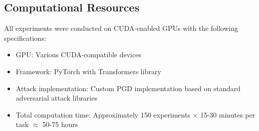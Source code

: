 \documentclass{article} %
\begin{document}
\subsection{Computational Resources}

All experiments were conducted on CUDA-enabled GPUs with the following specifications:
\begin{itemize}
    \item GPU: Various CUDA-compatible devices
    \item Framework: PyTorch with Transformers library
    \item Attack implementation: Custom PGD implementation based on standard adversarial attack libraries
    \item Total computation time: Approximately 150 experiments $\times$ 15-30 minutes per task $\approx$ 50-75 hours
\end{itemize}
\end{document}
